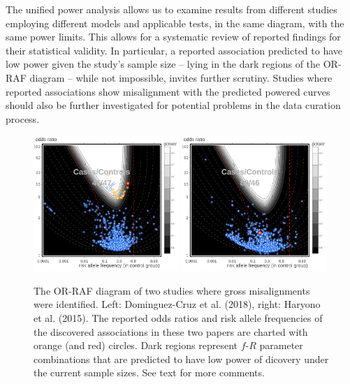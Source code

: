 \bigskip


The unified power analysis allows us to examine results from different studies employing different models and applicable tests, in the same diagram, with the same power limits.
This allows for a systematic review of reported findings for their statistical validity.
In particular, a reported association predicted to have low power given the study's sample size -- lying in the dark regions of the OR-RAF diagram -- while not impossible, invites further scrutiny.
Studies where reported associations show misalignment with the predicted powered curves should also be further investigated for potential problems in the data curation process.

\begin{figure}
    \centering
    \includegraphics[width=0.49\textwidth]{figures/forensics1.png}
    \includegraphics[width=0.49\textwidth]{figures/forensics2.png}
    \caption{The OR-RAF diagram of two studies where gross misalignments were identified. 
    Left: Dominguez-Cruz et al. (2018), right: Haryono et al. (2015). 
    The reported odds ratios and risk allele frequencies of the discovered associations in these two papers are charted with orange (and red) circles. 
    Dark regions represent $f$-$R$ parameter combinations that are predicted to have low power of dicovery under the current sample sizes.
    See text for more comments.}
    \label{fig:forensics}
\end{figure}

